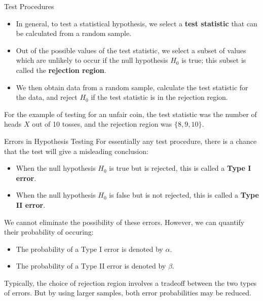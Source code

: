 \documentclass[handout]{beamer}
\renewcommand{\emph}{\textbf}
\begin{document}
\begin{frame}{Test Procedures}
\begin{itemize}
\item In general, to test a statistical hypothesis, we select a \emph{test statistic} that can be calculated from a random sample. 

\pause \item Out of the possible values of the test statistic, we select a subset of values which are unlikely to occur if the null hypothesis $H_0$ is true; this subset is called the \emph{rejection region}. 

\pause\item We then obtain data from a random sample, calculate the test statistic for the data, and reject $H_0$ if the test statistic is in the rejection region.
\end{itemize}

\pause For the example of testing for an unfair coin, the test statistic was the number of heads $X$ out of 10 tosses, and the rejection region was $\{8,9,10\}$.
\end{frame}

\begin{frame}{Errors in Hypothesis Testing}
For essentially any test procedure, there is a chance that the test will give a misleading conclusion:
\begin{itemize}
\pause\item When the null hypothesis $H_0$ is true but is rejected, this is called a \emph{Type I error}.
\pause\item When the null hypothesis $H_0$ is false but is not rejected, this is called a \emph{Type II error}.
\end{itemize}
\pause We cannot eliminate the possibility of these errors. However, we can quantify their probability of occuring:
\begin{itemize}
\pause\item The probability of a Type I error is denoted by $\alpha$.
\pause\item The probability of a Type II error is denoted by $\beta$.
\end{itemize}
\pause Typically, the choice of rejection region involves a tradeoff between the two types of errors. \pause But by using larger samples, both error probabilities may be reduced.
\end{frame}
\end{document}
